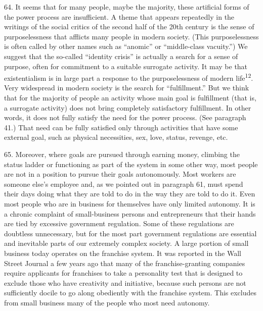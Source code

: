 \documentclass{article}
\begin{document}
64.  It seems that for many people, maybe the majority, these artificial forms of the power process 
are insufficient.  A theme that appears repeatedly in the writings of the social critics of the second 
half  of  the  20th  century  is  the  sense  of  purposelessness  that  afflicts  many  people  in  modern  
society.  (This purposelessness is often called by other names such as “anomic” or “middle-class 
vacuity.”) We suggest that the so-called “identity crisis” is actually a search for a sense of purpose, 
often for commitment to a suitable surrogate activity.  It may be that existentialism is in large part 
a response to the purposelessness of modern life\textsuperscript{12}. Very widespread in modern society is the search 
for  “fulfillment.”  But  we  think  that  for  the  majority  of  people  an  activity  whose  main  goal  is  
fulfillment (that is, a surrogate activity) does not bring completely satisfactory fulfillment.  In other 
words, it does not fully satisfy the need for the power process.  (See paragraph 41.) That need can 
be fully satisfied only through activities that have some external goal, such as physical necessities, 
sex, love, status, revenge, etc. \vspace{\baselineskip}

65.  Moreover,  where  goals  are  pursued  through  earning  money,  climbing  the  status  ladder  or  
functioning as part of the system in some other way, most people are not in a position to pursue 
their goals autonomously.  Most workers are someone else’s employee and, as we pointed out in 
paragraph 61, must spend their days doing what they are told to do in the way they are told to do 
it.   Even  most  people  who  are  in  business  for  themselves  have  only  limited  autonomy.   It  is  a  
chronic  complaint  of  small-business  persons  and  entrepreneurs  that  their  hands  are  tied  by  
excessive  government  regulation.   Some  of  these  regulations  are  doubtless  unnecessary,  but  for  
the most part government regulations are essential and inevitable parts of our extremely complex 
society.  A large portion of small business today operates on the franchise system.  It was reported 
in the Wall Street Journal a few years ago that many of the franchise-granting companies require 
applicants  for  franchises  to  take  a  personality  test  that  is  designed  to  exclude  those  who  have  
creativity and initiative,  because such persons  are not sufficiently  docile  to go along obediently 
with the franchise system.  This excludes from small business many of the people who most need 
autonomy. \vspace{\baselineskip}
\end{document}
